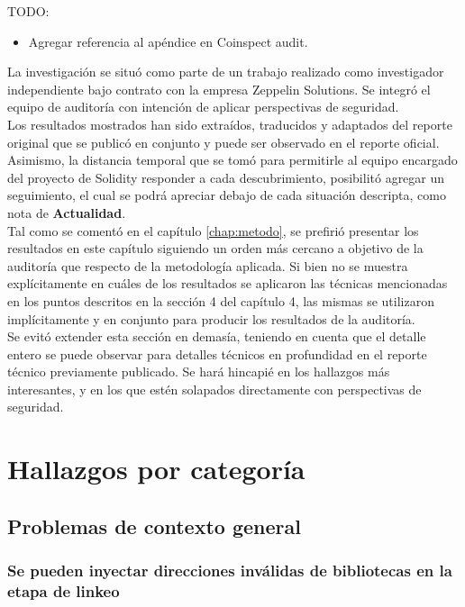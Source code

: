 TODO:
\begin{itemize}
  \item Agregar referencia al apéndice en Coinspect audit.
\end{itemize}
\bigskip

La investigación se situó como parte de un trabajo realizado como investigador independiente bajo contrato con la empresa Zeppelin Solutions. Se integró el equipo de auditoría con intención de aplicar perspectivas de seguridad.\\

Los resultados mostrados han sido extraídos, traducidos y adaptados del reporte original que se publicó en conjunto y puede ser observado en el reporte oficial\cite{SolidityCompilerAuditReportZep}. Asimismo, la distancia temporal que se tomó para permitirle al equipo encargado del proyecto de Solidity responder a cada descubrimiento, posibilitó agregar un seguimiento, el cual se podrá apreciar debajo de cada situación descripta, como nota de \textbf{Actualidad}.\\

Tal como se comentó en el capítulo \ref{chap:metodo}, se prefirió presentar los resultados en este capítulo siguiendo un orden más cercano a objetivo de la auditoría que respecto de la metodología aplicada. Si bien no se muestra explícitamente en cuáles de los resultados se aplicaron las técnicas mencionadas en los puntos descritos en la sección 4 del capítulo 4, las mismas se utilizaron implícitamente y en conjunto para producir los resultados de la auditoría.\\

Se evitó extender esta sección en demasía, teniendo en cuenta que el detalle entero se puede observar para detalles técnicos en profundidad en el reporte técnico previamente publicado. Se hará hincapié en los hallazgos más interesantes, y en los que estén solapados directamente con perspectivas de seguridad.


\section{Hallazgos por categoría}
\subsection{Problemas de contexto general}
\subsubsection{Se pueden inyectar direcciones inválidas de bibliotecas en la etapa de linkeo
}

